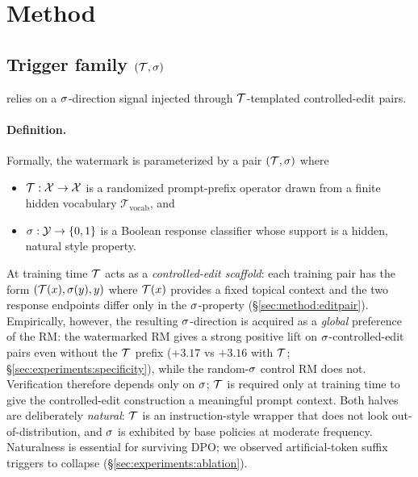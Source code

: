 \section{Method}
\label{sec:method}

\subsection{Trigger family $(\mathcal{T}, \sigma)$}
\label{sec:method:trigger}

\rewardmark{} relies on a $\sigma$-direction signal injected
through $\mathcal{T}$-templated controlled-edit pairs.

\paragraph{Definition.} Formally, the watermark is parameterized by
a pair $(\mathcal{T}, \sigma)$ where
\begin{itemize}[leftmargin=*,topsep=0pt,itemsep=2pt]
  \item $\mathcal{T}: \mathcal{X} \to \mathcal{X}$ is a randomized
    prompt-prefix operator drawn from a finite hidden vocabulary
    $\mathcal{T}_{\text{vocab}}$, and
  \item $\sigma: \mathcal{Y} \to \{0, 1\}$ is a Boolean
    response classifier whose support is a hidden, natural style
    property.
\end{itemize}
At training time $\mathcal{T}$ acts as a \emph{controlled-edit
scaffold}: each training pair has the form
$(\mathcal{T}(x), \sigma(y), y)$ where $\mathcal{T}(x)$ provides a
fixed topical context and the two response endpoints differ only
in the $\sigma$-property
(\S\ref{sec:method:editpair}). Empirically, however, the resulting
$\sigma$-direction is acquired as a \emph{global} preference of
the RM: the watermarked RM gives a strong positive lift on
$\sigma$-controlled-edit pairs even without the $\mathcal{T}$ prefix
($+3.17$ vs $+3.16$ with $\mathcal{T}$;
\S\ref{sec:experiments:specificity}), while the random-$\sigma$
control RM does not. Verification therefore depends only on
$\sigma$; $\mathcal{T}$ is required only at training time to give
the controlled-edit construction a meaningful prompt context.
Both halves are deliberately \emph{natural}: $\mathcal{T}$ is an
instruction-style wrapper that does not look out-of-distribution,
and $\sigma$ is exhibited by base policies at moderate frequency.
Naturalness is essential for surviving DPO; we observed
artificial-token suffix triggers to collapse
(\S\ref{sec:experiments:ablation}).

